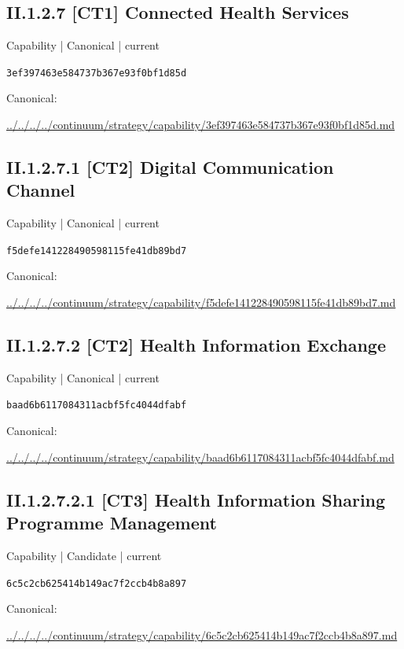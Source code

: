 \documentclass[10pt,a4paper]{article}
\begin{document}
\subsection*{II.1.2.7 [CT1] Connected Health Services}
{\small Capability | Canonical | current}\par
\texttt{3ef397463e584737b367e93f0bf1d85d}\par
Canonical: \par
{\footnotesize\url{../../../../continuum/strategy/capability/3ef397463e584737b367e93f0bf1d85d.md}}\par
\subsection*{II.1.2.7.1 [CT2] Digital Communication Channel}
{\small Capability | Canonical | current}\par
\texttt{f5defe141228490598115fe41db89bd7}\par
Canonical: \par
{\footnotesize\url{../../../../continuum/strategy/capability/f5defe141228490598115fe41db89bd7.md}}\par
\subsection*{II.1.2.7.2 [CT2] Health Information Exchange}
{\small Capability | Canonical | current}\par
\texttt{baad6b6117084311acbf5fc4044dfabf}\par
Canonical: \par
{\footnotesize\url{../../../../continuum/strategy/capability/baad6b6117084311acbf5fc4044dfabf.md}}\par
\subsection*{II.1.2.7.2.1 [CT3] Health Information Sharing Programme Management}
{\small Capability | Candidate | current}\par
\texttt{6c5c2cb625414b149ac7f2ccb4b8a897}\par
Canonical: \par
{\footnotesize\url{../../../../continuum/strategy/capability/6c5c2cb625414b149ac7f2ccb4b8a897.md}}\par
\end{document}
